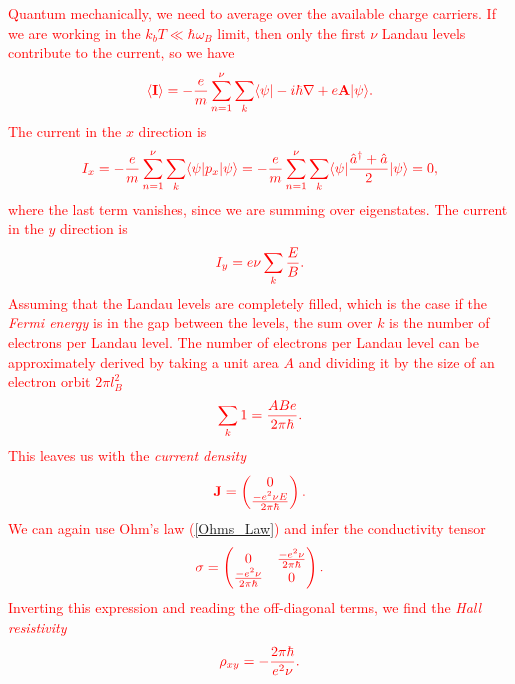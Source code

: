  \textcolor{red}{ Quantum mechanically, we need to average over the available charge carriers. If we are working in the $k_b T \ll \hbar \omega_B$ limit, then only the first $\nu$ Landau levels contribute to the current, so we have}
\begin{align}
    \textcolor{red}{ \langle {\bf I} \rangle = - \frac{e}{m} \sum_{n=1}^{\nu} \sum_{k}  \langle \psi |-i \hbar \nabla +e \bf{A} |\psi \rangle.}
\end{align}
 \textcolor{red}{ The current in the $x$ direction is }
\begin{align}
    \textcolor{red}{ I_x = -\frac{e}{m} \sum_{n=1}^{\nu} \sum_{k} \langle \psi|p_x | \psi \rangle= -\frac{e}{m} \sum_{n=1}^{\nu} \sum_{k} \langle \psi| \frac{\hat{a}^{\dagger}+ \hat{a}}{2} | \psi \rangle=0,}
\end{align}
\textcolor{red}{where the last term vanishes, since we are summing over eigenstates.}
 \textcolor{red}{The current in the $y$ direction is}
\begin{align}
    \textcolor{red}{ I_y = e \nu \sum_{k} \frac{E}{B}.}
\end{align}
 \textcolor{red}{ Assuming that the Landau levels are completely filled, which is the case if the \textit{Fermi energy} is in the gap between the levels, the sum over $k$ is the number of electrons per Landau level. The number of electrons per Landau level can be approximately derived by taking a unit area $A$ and dividing it by the size of an electron orbit $2 \pi l_B^2$ }
\begin{align}
    \textcolor{red}{ \sum_{k}1 =  \frac{A B e}{2 \pi \hbar}.}
\end{align}
 \textcolor{red}{ This leaves us with the \textit{current density}}
\begin{align}
  \textcolor{red}{  {\bf J} = \begin{pmatrix} 
0\\
        \frac{-e^2 \nu E}{2 \pi \hbar}
    \end{pmatrix}.}
\end{align}
 \textcolor{red}{ We can again use Ohm's law (\ref{Ohms_Law}) and infer the conductivity tensor}
\begin{align}
    \textcolor{red}{  \sigma = \begin{pmatrix}
        0&\frac{- e^2 \nu }{2\pi \hbar}\\
        \frac{- e^2 \nu }{2\pi \hbar}&0
    \end{pmatrix}.}
\end{align}
 \textcolor{red}{ Inverting this expression and reading the off-diagonal terms, we find the \textit{Hall resistivity} }
\begin{align}
    \textcolor{red}{ \rho_{xy} = - \frac{2 \pi \hbar}{e^2 \nu}.}
\end{align}



